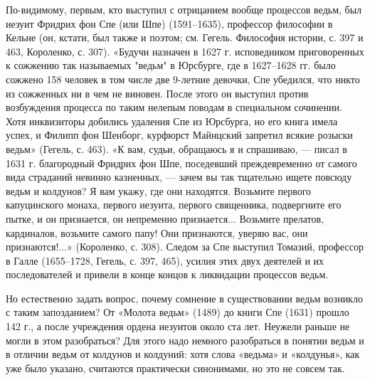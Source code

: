 По-видимому, первым, кто выступил с отрицанием вообще процессов ведьм,
был иезуит Фридрих фон Спе (или Шпе) (1591--1635), профессор философии
в  Кельне (он,  кстати,  был  также и  поэтом;  см. Гегель.  Философия
истории, с.  397 и 463,  Короленко, с.  307). «Будучи назначен  в 1627
г.  исповедником приговоренных  к  сожжению так  называемых "ведьм"  в
Юрсбурге, где  в 1627--1628 гг. было  сожжено 158 человек в  том числе
две 9-летние девочки, Спе убедился, что никто из сожженных ни в чем не
виновен. После этого он выступил  против возбуждения процесса по таким
нелепым  поводам в  специальном сочинении.  Хотя инквизиторы  добились
удаления  Спе из  Юрсбурга, но  его книга  имела успех,  и Филипп  фон
Шенборг, курфюрст Майнцский запретил всякие розыски ведьм» (Гегель, с.
463). «К  вам, судьи,  обращаюсь я  и спрашиваю, ---  писал в  1631 г.
благородный Фридрих фон Шпе,  поседевший преждевременно от самого вида
страданий невинно казненных, --- зачем  вы так тщательно ищете повсюду
ведьм и  колдунов? Я  вам укажу, где  они находятся.  Возьмите первого
капуцинского монаха, первого  иезуита, первого священника, подвергните
его  пытке,  и он  признается,  он  непременно признается...  Возьмите
прелатов,  кардиналов, возьмите  самого папу!  Они признаются,  уверяю
вас, они признаются!...»  (Короленко, с. 308). Следом  за Спе выступил
Томазий, профессор в  Галле (1655--1728, Гегель, с.  397, 465), усилия
этих двух  деятелей и  их последователей  и привели  в конце  концов к
ликвидации процессов ведьм.

Но естественно  задать вопрос,  почему сомнение в  существовании ведьм
возникло с  таким запозданием? От  «Молота ведьм» (1489) до  книги Спе
(1631) прошло  142 г.,  а после учреждения  ордена иезуитов  около ста
лет.  Неужели раньше  не  могли  в этом  разобраться?  Для этого  надо
немного разобраться  в понятии ведьм и  в отличии ведьм от  колдунов и
колдуний:  хотя слова  «ведьма» и  «колдунья», как  уже было  указано,
считаются практически синонимами, но это не совсем так.

